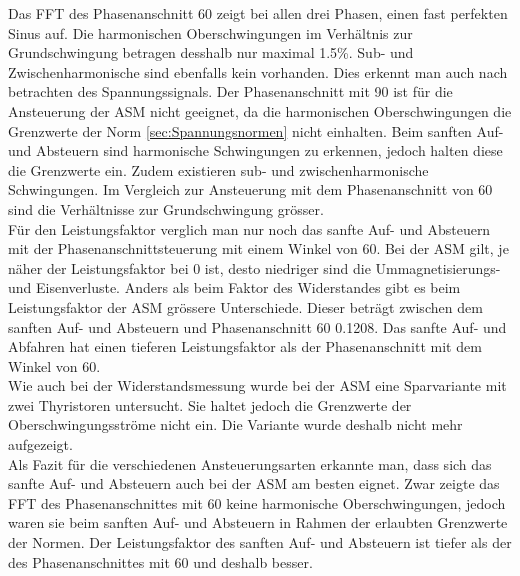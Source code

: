 Das FFT des Phasenanschnitt 60\textdegree \hspace{0.02cm} zeigt bei allen drei Phasen, einen fast perfekten Sinus auf.
Die harmonischen Oberschwingungen im Verhältnis zur Grundschwingung betragen desshalb nur maximal 1.5\%. Sub- und Zwischenharmonische sind ebenfalls kein vorhanden. Dies erkennt man auch nach betrachten des Spannungssignals.
Der Phasenanschnitt mit 90\textdegree \hspace{0.02cm} ist für die Ansteuerung der ASM nicht geeignet, da die harmonischen Oberschwingungen die Grenzwerte der Norm \ref{sec:Spannungsnormen} nicht einhalten. 
Beim sanften Auf- und Absteuern sind harmonische Schwingungen zu erkennen, jedoch halten diese die Grenzwerte ein. Zudem existieren sub- und zwischenharmonische Schwingungen. Im Vergleich zur Ansteuerung mit dem Phasenanschnitt von 60\textdegree \hspace{0.02cm} sind die Verhältnisse zur Grundschwingung grösser.\\ 

Für den Leistungsfaktor verglich man nur noch das sanfte Auf- und Absteuern mit der Phasenanschnittsteuerung mit einem Winkel von 60\textdegree \hspace{0.02cm}. Bei der ASM gilt, je näher der Leistungsfaktor bei 0 ist, desto niedriger sind die Ummagnetisierungs- und Eisenverluste. Anders als beim Faktor des Widerstandes gibt es beim Leistungsfaktor der ASM grössere Unterschiede. Dieser beträgt zwischen dem sanften Auf- und Absteuern und Phasenanschnitt 60\textdegree \hspace{0.02cm} 0.1208. Das sanfte Auf- und Abfahren hat einen tieferen Leistungsfaktor als der Phasenanschnitt mit dem Winkel von 60\textdegree. \\

Wie auch bei der Widerstandsmessung wurde bei der ASM eine Sparvariante mit zwei Thyristoren untersucht. Sie haltet jedoch die Grenzwerte der Oberschwingungsströme nicht ein. Die Variante wurde deshalb nicht mehr aufgezeigt.\\

Als Fazit für die verschiedenen Ansteuerungsarten erkannte man, dass sich das sanfte Auf- und Absteuern auch bei der ASM am besten eignet. Zwar zeigte das FFT des Phasenanschnittes mit 60\textdegree \hspace{0.02cm} keine harmonische Oberschwingungen, jedoch waren sie beim sanften Auf- und Absteuern in Rahmen der erlaubten Grenzwerte der Normen. Der Leistungsfaktor des sanften Auf- und Absteuern ist tiefer als der des Phasenanschnittes mit 60\textdegree \hspace{0.02cm} und deshalb besser.


